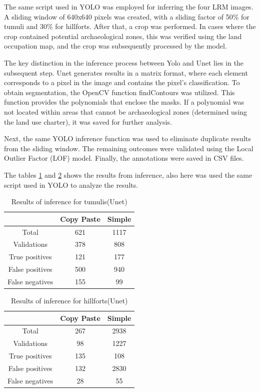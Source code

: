 The same script used in YOLO was employed for inferring the four LRM images. A sliding window of 640x640 pixels was created, with a sliding factor of 50\% for tumuli and 30\% for hillforts. After that, a crop was performed. In cases where the crop contained potential archaeological zones, this was verified using the land occupation map, and the crop was subsequently processed by the model.

The key distinction in the inference process between Yolo and Unet lies in the subsequent step. Unet generates results in a matrix format, where each element corresponds to a pixel in the image and contains the pixel's classification. To obtain segmentation, the OpenCV function findContours was utilized. This function provides the polynomials that enclose the masks. If a polynomial was not located within areas that cannot be archaeological zones (determined using the land use charter), it was saved for further analysis.

Next, the same YOLO inference function was used to eliminate duplicate results from the sliding window. The remaining outcomes were validated using the Local Outlier Factor (LOF) model. Finally, the annotations were saved in CSV files.

The tables \ref{Results of inference for tumulis(Unet)} and \ref{Results of inference for hillforts(Unet)} shows the results from inference, also here was used the same script used in YOLO to analyze the results.

\begin{table}[H]
\centering
\begin{tabular}{|c c c|} 
 \hline
  &  Copy Paste & Simple \\ [0.5ex] 
 \hline\hline
 Total & 621 & 1117 \\ 
 Validations & 378 & 808 \\
 True positives & 121 & 177 \\
 False positives & 500 & 940 \\
 False negatives & 155 & 99\\ [1ex] 
 \hline
\end{tabular}
\caption{Results of inference for tumulis(Unet)}
\label{Results of inference for tumulis(Unet)}
\end{table}

\begin{table}[H]
\centering
\begin{tabular}{|c c c|} 
 \hline
  & Copy Paste & Simple \\ [0.5ex] 
 \hline\hline
 Total & 267 & 2938 \\ 
 Validations & 98 & 1227\\
 True positives & 135 & 108 \\
 False positives & 132 & 2830 \\
 False negatives & 28 & 55\\ [1ex] 
 \hline
\end{tabular}
\caption{Results of inference for hillforts(Unet)}
\label{Results of inference for hillforts(Unet)}
\end{table}

